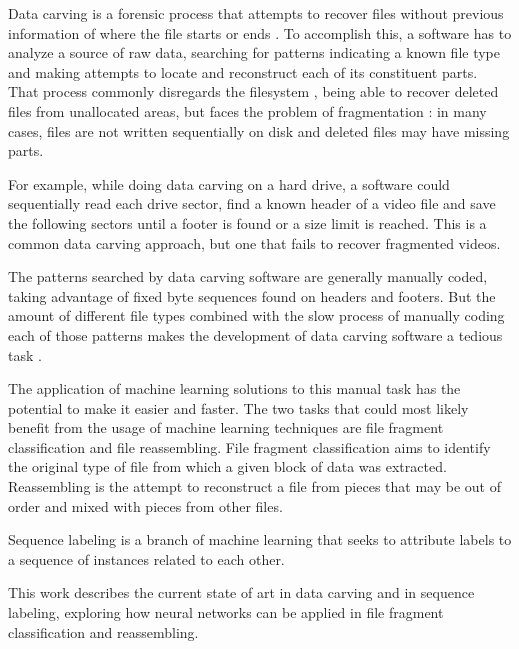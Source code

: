 Data carving is a forensic process that attempts to recover files without previous information of where the file starts or ends \cite{garfinkel_carving_2007}.
To accomplish this, a software has to analyze a source of raw data, searching for patterns indicating a known file type and making attempts to locate and reconstruct each of its constituent parts.
That process commonly disregards the filesystem \cite{veenman_statistical_2007}, being able to recover deleted files from unallocated areas, but faces the problem of fragmentation \cite{veenman_statistical_2007}  \cite{pal_evolution_2009}: in many cases, files are not written sequentially on disk and deleted files may have missing parts.

For example, while doing data carving on a hard drive, a software could sequentially read each drive sector, find a known header of a video file and save the following sectors until a footer is found or a size limit is reached. This is a common data carving approach, but one that fails to recover fragmented videos.

The patterns searched by data carving software are generally manually coded, taking advantage of fixed byte sequences found on headers and footers. But the amount of different file types combined with the slow process of manually coding each of those patterns makes the development of data carving software a tedious task \cite{mcdaniel_content_2003}.

The application of machine learning solutions to this manual task has the potential to make it easier and faster. The two tasks that could most likely benefit from the usage of machine learning techniques are file fragment classification and file reassembling. File fragment classification aims to identify the original type of file from which a given block of data was extracted. Reassembling is the attempt to reconstruct a file from pieces that may be out of order and mixed with pieces from other files.

Sequence labeling is a branch of machine learning that seeks to attribute labels to a sequence of instances related to each other.

This work describes the current state of art in data carving and in sequence labeling, exploring how neural networks can be applied in file fragment classification and reassembling.